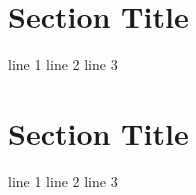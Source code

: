 \section{Section Title}
line 1
line 2
line 3
\section{Section Title}
line 1
line 2
line 3\parencite{latexcompanion}
